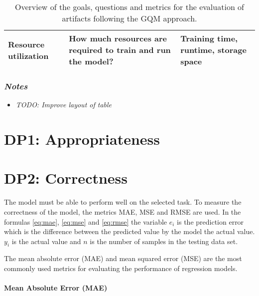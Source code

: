 \begin{table}[H]
\begin{tcolorbox}[arc=0pt,boxrule=0.5pt]
{\begin{tabular}{p{2cm}p{8cm}p{3cm}}
                \hdashline
                \textbf{Resource utilization} & How much resources are required to train and run the model?                                                     & Training time, runtime, storage space                \\
                \bottomrule
            \end{tabular}
            \caption{Overview of the goals, questions and metrics for the evaluation of artifacts following the \ac{GQM} approach.}
        } %
    \end{tcolorbox}
\end{table}

\subsubsection*{\textit{Notes}}

\begin{itemize}
    \item \textit{TODO: Improve layout of table}
\end{itemize}


\section{DP1: Appropriateness}


\section{DP2: Correctness}
The model must be able to perform well on the selected task.
To measure the correctness of the model, the metrics MAE, MSE and RMSE are used.
In the formulas \ref{eq:mae}, \ref{eq:mse} and \ref{eq:rmse} the variable $e_i$ is the prediction error which is the difference between the predicted value by the model the actual value.
$y_i$ is the actual value and $n$ is the number of samples in the testing data set.

The mean absolute error (MAE) and mean squared error (MSE) are the most commonly used metrics for evaluating the performance of regression models. \paragraph*{Mean Absolute Error (MAE)}

